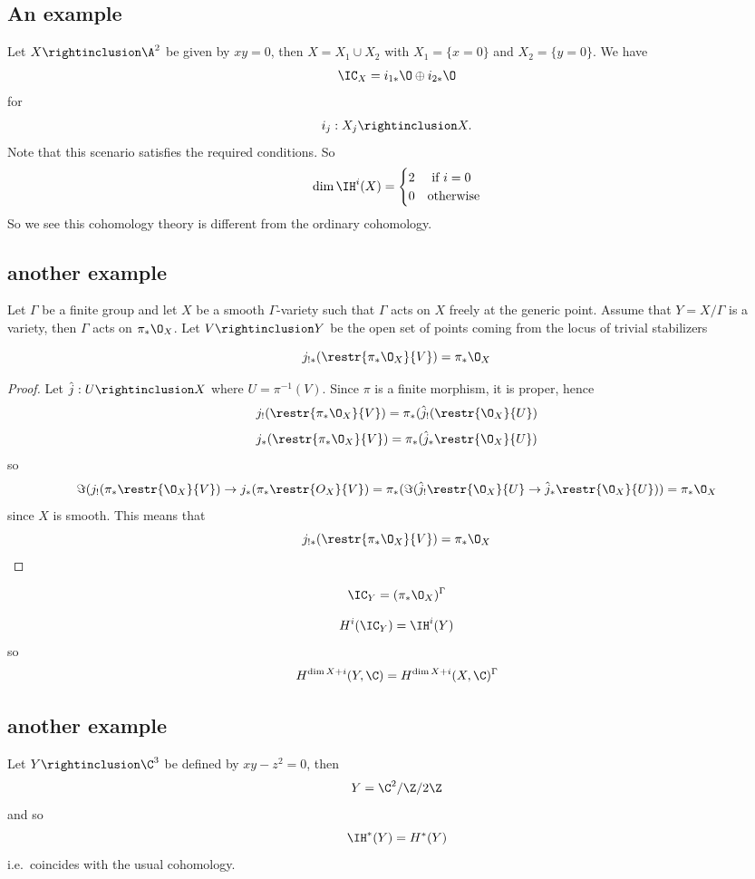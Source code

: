 \documentclass[etingof-dmod.tex]{subfiles}
\begin{document}
\subsection{An example}
  Let $X \rightinclusion \A^2$ be given by $xy = 0$, then $X = X_1 \cup X_2$
  with $X_1 = \{x=0\}$ and $X_2 = \{y=0\}$. We have $$\IC_X = i_{1*}\O \oplus
  i_{2*}\O$$ for $$i_j : X_j \rightinclusion X.$$ Note that this scenario
  satisfies the required conditions. So $$\dim \IH^i(X) = \begin{cases} 2 &
    \text{ if } i =
    0 \\
  0 & \text{otherwise} \end{cases}$$
  So we see this cohomology theory is different from the ordinary cohomology.
  \subsection{another example}
 Let $\Gamma$ be a finite group and let $X$ be a smooth $\Gamma$-variety
  such that $\Gamma$ acts on $X$ freely at the generic point. Assume that $Y = X /
  \Gamma$ is a variety, then $\Gamma$ acts on $\pi_* \O_X$. Let $V
  \rightinclusion Y$ be the open set of points coming from the locus of trivial
  stabilizers
  \begin{lem}
    $$j_{!*} ( \restr{\pi_* \O_X}{V}) = \pi_* \O_X$$
  \end{lem}
  \begin{proof}
    Let $\hat{j} : U \rightinclusion X$ where $U = \pi^{-1}(V)$. Since $\pi$ is a
    finite morphism, it is proper, hence $$j_! ( \restr{\pi_* \O_X}{V}) = \pi_*
    ( \hat{j}_!(\restr{\O_X}{U})$$
      $$j_*( \restr{\pi_* \O_X}{V}) = \pi_*( \hat{j}_*
      \restr{\O_X}{U})$$
      so $$\Im(j_! (\pi_* \restr{\O_X}{V}) \rightarrow j_*(\pi_* \restr{O_X}{V})
        = \pi_*(\Im(\hat{j}_! \restr{\O_X}{U} \rightarrow \hat{j}_*
        \restr{\O_X}{U})) = \pi_*\O_X$$
        since $X$ is smooth. This means that $$j_{!*}( \restr{\pi_*\O_X}{V}) =
        \pi_*\O_X$$
  \end{proof}

  \begin{cor}
    $$\IC_Y = (\pi_*\O_X)^{\Gamma}$$
  \end{cor}
  \begin{cor}
    $$H^i(\IC_Y) = \IH^{i}(Y)$$ so $$H^{\dim X+i}(Y,\C) =
    H^{\dim X+i}(X,\C)^{\Gamma}$$
  \end{cor}

  \subsection{another example}
    Let $Y \rightinclusion \C^3$ be defined by $xy - z^2 = 0$, then $$Y = \C^2 /
    {\Z/2\Z}$$ and so $$\IH^*(Y) = H^*(Y)$$ i.e.\ coincides with the usual
    cohomology.
\end{document}
